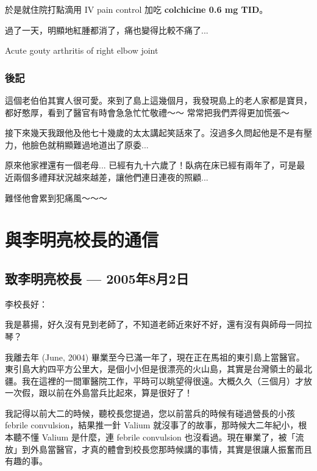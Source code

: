 \documentclass[12pt,a4paper]{article}
\newenvironment{myquote}{%
    \begin{tcolorbox}[
        colback=quote_bg,
        colframe=emergency_gray,
        boxrule=0pt,
        leftrule=3pt,
        arc=0pt,
        left=10pt,
        right=10pt,
        top=8pt,
        bottom=8pt
    ]
    \itshape
}{%
    \end{tcolorbox}
}
\begin{document}
於是就住院打點滴用 IV pain control 加吃 \textbf{colchicine 0.6 mg TID}。

過了一天，明顯地紅腫都消了，痛也變得比較不痛了...

\begin{tcolorbox}[
    colback=emergency_blue!10!white,
    colframe=emergency_blue,
    title=\textbf{Diagnosis},
    fonttitle=\bfseries
]
Acute gouty arthritis of right elbow joint
\end{tcolorbox}

\subsubsection{後記}

這個老伯伯其實人很可愛。來到了島上這幾個月，我發現島上的老人家都是寶貝，都好憨厚，看到了醫官有時會急急忙忙敬禮～～ 常常把我們弄得更加慌張～

接下來幾天我跟他及他七十幾歲的太太講起笑話來了。沒過多久問起他是不是有壓力，他臉色就稍顯難過地道出了原委...

原來他家裡還有一個老母... 已經有九十六歲了！臥病在床已經有兩年了，可是最近兩個多禮拜狀況越來越差，讓他們連日連夜的照顧...

\begin{myquote}
難怪他會累到犯痛風～～～
\end{myquote}

\section{與李明亮校長的通信}

\subsection{致李明亮校長 — 2005年8月2日}

李校長好：

我是慕揚，好久沒有見到老師了，不知道老師近來好不好，還有沒有與師母一同拉琴？

我離去年 (June, 2004) 畢業至今已滿一年了，現在正在馬祖的東引島上當醫官。東引島大約四平方公里大，是個小小但是很漂亮的火山島，其實是台灣領土的最北疆。我在這裡的一間軍醫院工作，平時可以眺望得很遠。大概久久（三個月）才放一次假，跟以前在外島當兵比起來，算是很好了！

我記得以前大二的時候，聽校長您提過，您以前當兵的時候有碰過營長的小孩 febrile convulsion，結果推一針 Valium 就沒事了的故事，那時候大二年紀小，根本聽不懂 Valium 是什麼，連 febrile convulsion 也沒看過。現在畢業了，被「流放」到外島當醫官，才真的體會到校長您那時候講的事情，其實是很讓人振奮而且有趣的事。
\end{document}

